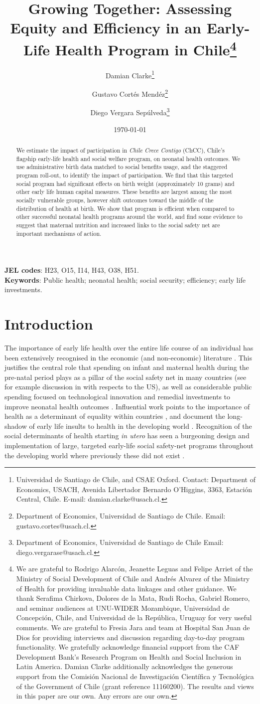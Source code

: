 \documentclass[12pt]{article}
\title{\textbf{Growing Together}:
  Assessing Equity and Efficiency in an Early-Life Health Program in Chile\thanks{
    We are grateful to Rodrigo Alarc\'on, Jeanette Leguas and Felipe Arriet of
         the Ministry of Social Development of Chile and Andr\'es Alvarez of the
         Ministry of Health for providing invaluable data linkages and other
         guidance.  We thank Serafima Chirkova, Dolores de la Mata, Rudi Rocha,
         Gabriel Romero, and seminar audiences at UNU-WIDER Mozambique,
         Universidad de Concepci\'on, Chile, and Universidad de la Rep\'ublica,
         Uruguay for very useful comments.  We are grateful to Fresia Jara and
         team at Hospital San Juan de
         Dios for providing interviews and discussion regarding day-to-day
         program functionality.  We gratefully acknowledge financial
         support from the CAF Development Bank's Research Program on Health and
         Social Inclusion in Latin America.  Damian Clarke additionally
         acknowledges the generous support from the Comisi\'on Nacional de
         Investigaci\'on Cient\'ifica y Tecnol\'ogica of the Government of Chile
         (grant reference 11160200).  The results and views in this paper are
         our own. Any errors are our own.}}
\author{Damian Clarke\thanks{Universidad de Santiago
    de Chile, and CSAE Oxford. Contact: Department of Economics, USACH, Avenida Libertador
    Bernardo O'Higgins, 3363, Estaci\'on Central, Chile. E-mail: damian.clarke@usach.cl.}
  \and Gustavo Cort\'es Mend\'ez\thanks{Department of Economics, Universidad de Santiago
    de Chile. Email: gustavo.cortes@usach.cl.}
\and Diego Vergara Sep\'ulveda\thanks{Department of Economics, Universidad de Santiago
    de Chile Email: diego.vergarase@usach.cl.}}
\date{\today}
\begin{document}
\maketitle
\thispagestyle{empty}
\vspace{-1cm}



\begin{spacing}{1.4}
\begin{abstract}
  We estimate the impact of participation in \emph{Chile Crece Contigo} (ChCC),
  Chile's flagship early-life health and social welfare program, on neonatal
  health outcomes. We use administrative birth data matched to social benefits
  usage, and the staggered program roll-out, to identify the impact of
  participation.  %
  We find that this targeted social program had significant effects on birth
  weight (approximately 10 grams) and other early life human capital measures.
  These benefits are largest among the most socially vulnerable groups, however
  shift outcomes toward the middle of the distribution of health at birth. We
  show that program is efficient when compared to other successful neonatal
  health programs around the world, and find some evidence to suggest that
  maternal nutrition and increased links to the social safety net are important
  mechanisms of action.
\end{abstract}
\noindent \textbf{JEL codes}: H23, O15, I14, H43, O38, H51. \\
\noindent \hspace{1mm} \textbf{Keywords}: Public health; neonatal health; social
security; efficiency; early life investments. \\

\clearpage
\section{Introduction}
The importance of early life health over the entire life course of an
individual has been extensively recognised in the economic (and
non-economic) literature \citep{Almondetal2017,AlmondCurrie2011,Barker1990}.
This justifies the central role that spending on infant and maternal health
during the pre-natal period plays as a pillar of the social safety net in
many countries (see for example discussion in \citet{BitlerKaroly2015}
with respects to the US), as well as considerable public spending focused on
technological innovation and remedial investments to improve neonatal health
outcomes \citep{Almondetal2010,Bharadwajetal2013}.  Influential work points
to the importance of health as a determinant of equality within countries
\citep{Deaton2003}, and document the long-shadow of early life insults to
health in the developing world \citep{CurrieVogl2012}.   Recognition of the
social determinants of health starting \emph{in utero} has seen a burgeoning
design and implementation of large, targeted early-life social safety-net
programs throughout the developing world where previously these did not
exist \citep{Monteiroetal2015}.


\end{spacing}
\end{document}

